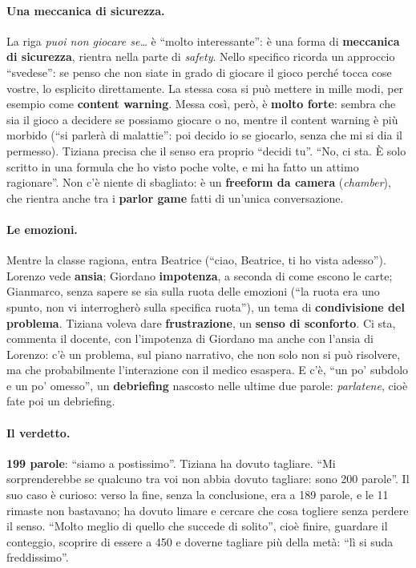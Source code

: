 \paragraph{Una meccanica di sicurezza.} La riga \emph{puoi non giocare se\ldots} è
``molto interessante'': è una forma di \textbf{meccanica di sicurezza}, rientra nella
parte di \emph{safety}. Nello specifico ricorda un approccio ``svedese'': se penso che
non siate in grado di giocare il gioco perché tocca cose vostre, lo esplicito
direttamente. La stessa cosa si può mettere in mille modi, per esempio come
\textbf{content warning}. Messa così, però, è \textbf{molto forte}: sembra che sia il
gioco a decidere se possiamo giocare o no, mentre il content warning è più morbido
(``si parlerà di malattie'': poi decido io se giocarlo, senza che mi si dia il
permesso). Tiziana precisa che il senso era proprio ``decidi tu''. ``No, ci sta. È
solo scritto in una formula che ho visto poche volte, e mi ha fatto un attimo
ragionare''. Non c'è niente di sbagliato: è un \textbf{freeform da camera}
(\emph{chamber}), che rientra anche tra i \textbf{parlor game} fatti di un'unica
conversazione.

\paragraph{Le emozioni.} Mentre la classe ragiona, entra Beatrice (``ciao, Beatrice,
ti ho vista adesso''). Lorenzo vede \textbf{ansia}; Giordano
\textbf{impotenza}, a seconda di come escono le carte; Gianmarco, senza sapere se sia
sulla ruota delle emozioni (``la ruota era uno spunto, non vi interrogherò sulla
specifica ruota''), un tema di \textbf{condivisione del problema}. Tiziana voleva dare
\textbf{frustrazione}, un \textbf{senso di sconforto}. Ci sta, commenta il docente,
con l'impotenza di Giordano ma anche con l'ansia di Lorenzo: c'è un problema, sul
piano narrativo, che non solo non si può risolvere, ma che probabilmente
l'interazione con il medico esaspera. E c'è, ``un po' subdolo e un po' omesso'', un
\textbf{debriefing} nascosto nelle ultime due parole: \emph{parlatene}, cioè fate poi
un debriefing.

\paragraph{Il verdetto.} \textbf{199 parole}: ``siamo a postissimo''. Tiziana ha
dovuto tagliare. ``Mi sorprenderebbe se qualcuno tra voi non abbia dovuto tagliare:
sono 200 parole''. Il suo caso è curioso: verso la fine, senza la conclusione, era a
189 parole, e le 11 rimaste non bastavano; ha dovuto limare e cercare che cosa
togliere senza perdere il senso. ``Molto meglio di quello che succede di solito'',
cioè finire, guardare il conteggio, scoprire di essere a 450 e doverne tagliare più
della metà: ``lì si suda freddissimo''.

